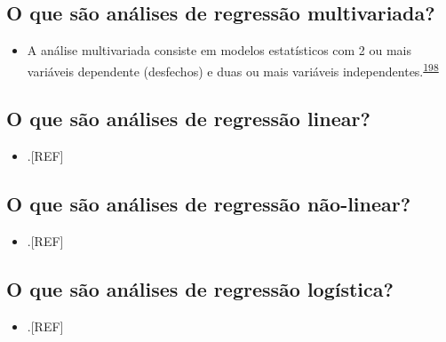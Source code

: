 \documentclass[
  a4paper,
]{book}
\providecommand{\tightlist}{%
  \setlength{\itemsep}{0pt}\setlength{\parskip}{0pt}}
\begin{document}
\hypertarget{o-que-suxe3o-anuxe1lises-de-regressuxe3o-multivariada}{%
\subsection{O que são análises de regressão multivariada?}\label{o-que-suxe3o-anuxe1lises-de-regressuxe3o-multivariada}}

\begin{itemize}
\tightlist
\item
  A análise multivariada consiste em modelos estatísticos com 2 ou mais variáveis dependente (desfechos) e duas ou mais variáveis independentes.\textsuperscript{\protect\hyperlink{ref-Hidalgo2013}{198}}
\end{itemize}

\hypertarget{o-que-suxe3o-anuxe1lises-de-regressuxe3o-linear}{%
\subsection{O que são análises de regressão linear?}\label{o-que-suxe3o-anuxe1lises-de-regressuxe3o-linear}}

\begin{itemize}
\tightlist
\item
  .{[}REF{]}
\end{itemize}

\hypertarget{o-que-suxe3o-anuxe1lises-de-regressuxe3o-nuxe3o-linear}{%
\subsection{O que são análises de regressão não-linear?}\label{o-que-suxe3o-anuxe1lises-de-regressuxe3o-nuxe3o-linear}}

\begin{itemize}
\tightlist
\item
  .{[}REF{]}
\end{itemize}

\hypertarget{o-que-suxe3o-anuxe1lises-de-regressuxe3o-loguxedstica}{%
\subsection{O que são análises de regressão logística?}\label{o-que-suxe3o-anuxe1lises-de-regressuxe3o-loguxedstica}}

\begin{itemize}
\tightlist
\item
  .{[}REF{]}
\end{itemize}
\end{document}
